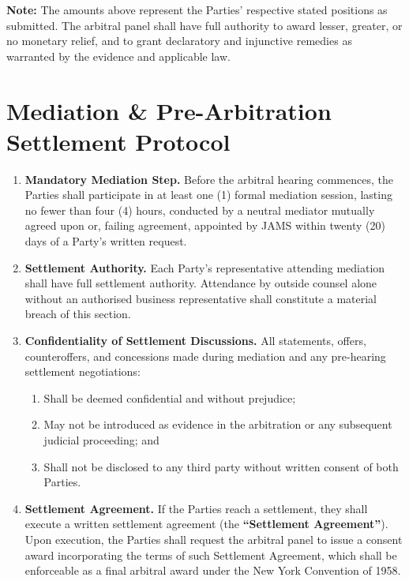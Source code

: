 \documentclass[11pt,a4paper]{article}
\begin{document}
\vspace{6pt}
\begin{tcolorbox}[alertbox]
  \sffamily\small
  {\color{AlertBorder}\faExclamationTriangle}\quad
  \textbf{Note:} The amounts above represent the Parties' respective stated positions
  as submitted. The arbitral panel shall have full authority to award lesser, greater,
  or no monetary relief, and to grant declaratory and injunctive remedies as warranted
  by the evidence and applicable law.
\end{tcolorbox}

\section{Mediation \& Pre-Arbitration Settlement Protocol}

\begin{enumerate}
  \item \textbf{Mandatory Mediation Step.} Before the arbitral hearing commences,
    the Parties shall participate in at least one (1) formal mediation session,
    lasting no fewer than four (4) hours, conducted by a neutral mediator
    mutually agreed upon or, failing agreement, appointed by JAMS within
    twenty (20) days of a Party's written request.

  \item \textbf{Settlement Authority.} Each Party's representative attending
    mediation shall have full settlement authority. Attendance by outside counsel
    alone without an authorised business representative shall constitute a
    material breach of this section.

  \item \textbf{Confidentiality of Settlement Discussions.} All statements,
    offers, counteroffers, and concessions made during mediation and any
    pre-hearing settlement negotiations:
    \begin{enumerate}
      \item Shall be deemed confidential and without prejudice;
      \item May not be introduced as evidence in the arbitration or any
        subsequent judicial proceeding; and
      \item Shall not be disclosed to any third party without written consent
        of both Parties.
    \end{enumerate}

  \item \textbf{Settlement Agreement.} If the Parties reach a settlement,
    they shall execute a written settlement agreement (the \textbf{``Settlement
    Agreement''}). Upon execution, the Parties shall request the arbitral panel
    to issue a consent award incorporating the terms of such Settlement Agreement,
    which shall be enforceable as a final arbitral award under the New York
    Convention of 1958.
\end{enumerate}
\end{document}
